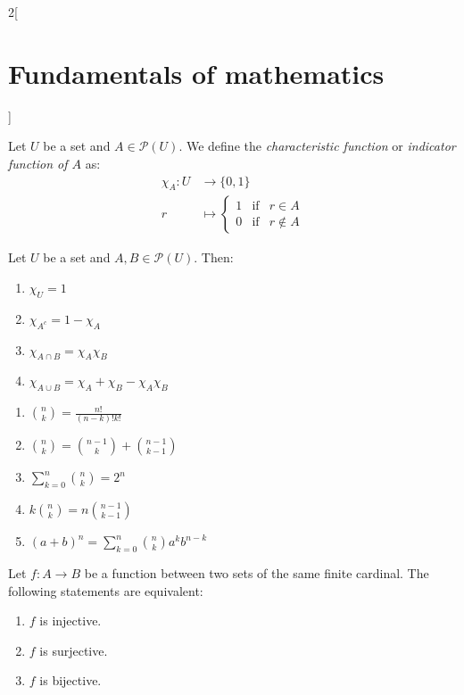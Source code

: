 \documentclass[../../../main.tex]{subfiles}
\begin{document}
\begin{multicols}{2}[\section{Fundamentals of mathematics}]
  \begin{definition}
    Let $U$ be a set and $A\in\mathcal{P}(U)$. We define the \textit{characteristic function} or \textit{indicator function of $A$} as:
    \begin{align*}
      \chi_A:U & \longrightarrow\{0,1\} \\
      r        & \longmapsto \left\{
      \begin{array}{rcl}
        1 & \text{if} & r\in A    \\
        0 & \text{if} & r\notin A
      \end{array}\right.
    \end{align*}
  \end{definition}
  \begin{prop}
    Let $U$ be a set and $A,B\in\mathcal{P}(U)$. Then:
    \begin{enumerate}
      \item $\chi_U=1$
      \item $\chi_{A^c}=1-\chi_A$
      \item $\chi_{A\cap B}=\chi_A\chi_B$
      \item $\chi_{A\cup B}=\chi_A+\chi_B-\chi_A\chi_B$
    \end{enumerate}
  \end{prop}
  \begin{prop}\hfill
    \begin{enumerate}
      \item $\binom{n}{k}=\frac{n!}{(n-k)!k!}$
      \item $\binom{n}{k}=\binom{n-1}{k}+\binom{n-1}{k-1}$
      \item $\sum_{k=0}^n\binom{n}{k}=2^n$
      \item $k\binom{n}{k}=n\binom{n-1}{k-1}$
      \item $(a+b)^n=\sum_{k=0}^n\binom{n}{k}a^kb^{n-k}$
    \end{enumerate}
  \end{prop}
  \begin{prop}
    Let $f:A\rightarrow B$ be a function between two sets of the same finite cardinal. The following statements are equivalent:
    \begin{enumerate}
      \item $f$ is injective.
      \item $f$ is surjective.
      \item $f$ is bijective.
    \end{enumerate}
  \end{prop}

\end{multicols}
\end{document}
